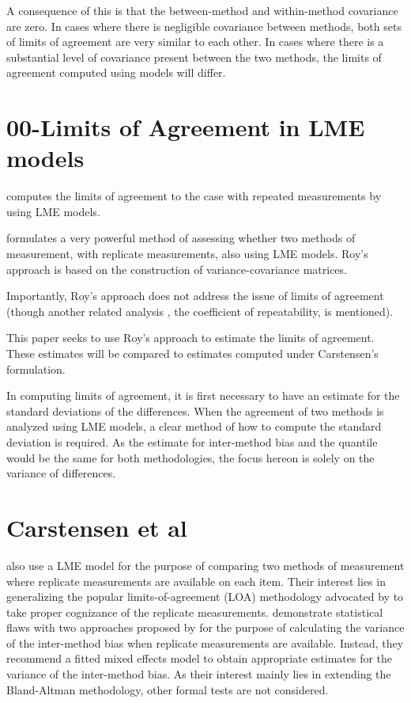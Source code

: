 \documentclass[12pt, a4paper]{report}
\theoremstyle{plain}
\theoremstyle{definition}
\theoremstyle{remark}
\begin{document}
A consequence of this is that the between-method and within-method covariance are zero. In cases where there is negligible covariance between methods, both sets of limits of agreement are very similar to each other. In cases where there is a substantial level of covariance present between the two methods, the limits of agreement computed using models will differ.
	
	
	

\section{00-Limits of Agreement in LME models}

\citet{BXC2008} computes the limits of agreement to the case with repeated measurements by using LME models.
	
\citet{ARoy2009} formulates a very powerful method of assessing whether two methods of measurement, with replicate measurements, also using LME models. Roy's approach is based on the construction of variance-covariance matrices.

Importantly, Roy's approach does not address the issue of limits of agreement (though another related analysis , the coefficient of repeatability, is mentioned).

This paper seeks to use Roy's approach to estimate the limits of agreement. These estimates will be compared to estimates computed under Carstensen's formulation.

In computing limits of agreement, it is first necessary to have an estimate for the standard deviations of the differences. When the agreement of two methods is analyzed using LME models, a clear method of how to compute the standard deviation is required. As the estimate for inter-method bias and the quantile would be the same for both methodologies, the focus hereon is solely on the variance of differences.
	
\section{Carstensen et al}
\cite{BXC2008} also use a LME model for the purpose of comparing two methods of measurement where replicate measurements are available on each item. Their interest lies in generalizing the popular limits-of-agreement (LOA) methodology advocated by \citet{BA86} to take proper cognizance of the replicate measurements. \citet{BXC2008} demonstrate statistical flaws with two approaches proposed by \citet{BA99} for the purpose of calculating the variance of the inter-method bias when replicate measurements are available. Instead, they recommend a fitted mixed effects model to obtain appropriate estimates for the variance of the inter-method bias. As their interest mainly lies in extending the Bland-Altman methodology, other formal tests are not considered.
	
\end{document}
